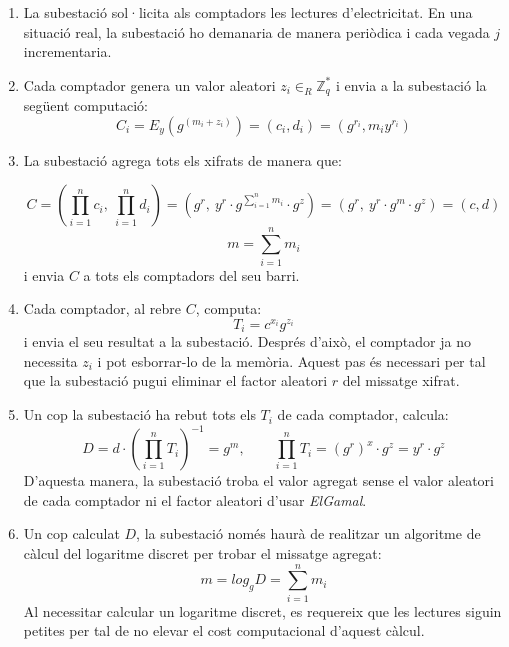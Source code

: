 \begin{enumerate}
	\item La subestació sol·licita als comptadors les lectures d'electricitat. En una situació real, la subestació ho demanaria de manera periòdica i cada vegada $j$ incrementaria.
	\item Cada comptador genera un valor aleatori $z_i \in_R {\mathbb{Z}_{q}^*}$ i envia a la subestació la següent computació: 
	\[C_i = E_y(g^{(m_i + z_i)}) = (c_i, d_i) = (g^{r_i}, m_i y^{r_i})\]
	\item La subestació agrega tots els xifrats de manera que:
	
	\[C = (\prod_{i=1}^{n} c_i, \ \prod_{i=1}^{n} d_i) = (g^r, \ y^r \cdot g ^{\sum_{i=1}^{n} m_i} \cdot g^z) = (g^r, \ y^r \cdot g^m \cdot g^z ) =  (c, d)\]
	\[m = \sum_{i=1}^{n} m_i\]
	i envia $C$ a tots els comptadors del seu barri.\label{en:busom-s1}
	\item Cada comptador, al rebre $C$, computa:
	\[T_i = c^{x_i} g^{z_i}\]
	i envia el seu resultat a la subestació. Després d'això, el comptador ja no necessita $z_i$ i pot esborrar-lo de la memòria. Aquest pas és necessari per tal que la subestació pugui eliminar el factor aleatori $r$ del missatge xifrat.\label{en:busom-m1}
	\item Un cop la subestació ha rebut tots els $T_i$ de cada comptador, calcula:
	\[D = d \cdot (\prod_{i=1}^{n} T_i)^{-1} = g^m, \qquad \prod_{i=1}^{n} T_i = (g^{r})^x \cdot g^z = y^r \cdot g^z\]
	D'aquesta manera, la subestació troba el valor agregat sense el valor aleatori de cada comptador ni el factor aleatori d'usar \textit{ElGamal}.
	\item Un cop calculat $D$, la subestació només haurà de realitzar un algoritme de càlcul del logaritme discret per trobar el missatge agregat:
	\[m = log_g D = \sum_{i=1}^{n} m_i\]
	Al necessitar calcular un logaritme discret, es requereix que les lectures siguin petites per tal de no elevar el cost computacional d'aquest càlcul.
\end{enumerate}
